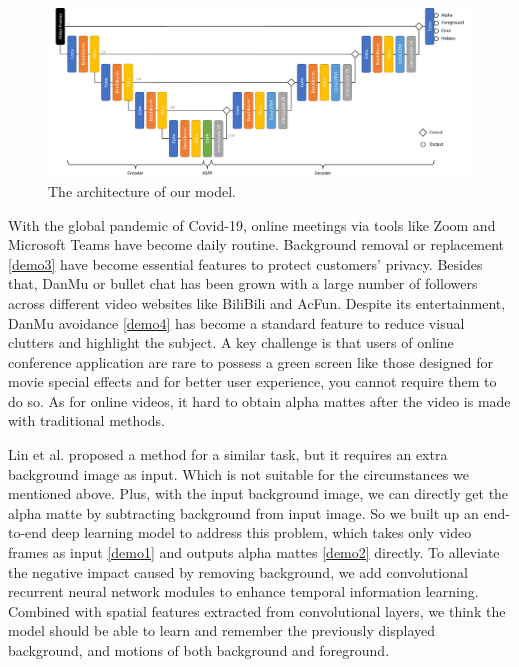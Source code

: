 \documentclass[final]{cvpr}
\begin{document}
\begin{figure}[htb]
    \begin{center}
        \includegraphics[width=1\textwidth]{img/modelConvLSTM.pdf}
    \end{center}
    \caption{The architecture of our model.}
    \label{modelConvLSTM}
\end{figure}

With the global pandemic of Covid-19, online meetings via tools like Zoom and Microsoft Teams have become daily routine.
Background removal or replacement \ref{demo3} have become essential features to protect customers' privacy.
Besides that, DanMu or bullet chat has been grown with a large number of followers across different video websites like BiliBili and AcFun.
Despite its entertainment, DanMu avoidance \ref{demo4} has become a standard feature to reduce visual clutters and highlight the subject.
A key challenge is that users of online conference application are rare to possess a green screen like those designed for movie special effects and for better user experience, you cannot require them to do so. As for online videos, it hard to obtain alpha mattes after the video is made with traditional methods.

Lin et al. \cite{linRealTimeHighResolutionBackground2020a} proposed a method for a similar task, but it requires an extra background image as input.
Which is not suitable for the circumstances we mentioned above.
Plus, with the input background image, we can directly get the alpha matte by subtracting background from input image.
So we built up an end-to-end deep learning model to address this problem, which takes only video frames as input \ref{demo1} and outputs alpha mattes \ref{demo2} directly.
To alleviate the negative impact caused by removing background, we add convolutional recurrent neural network modules to enhance temporal information learning.
Combined with spatial features extracted from convolutional layers, we think the model should be able to learn and remember the previously displayed background, and motions of both background and foreground.
\end{document}
